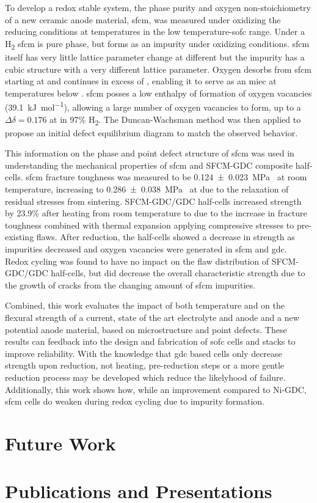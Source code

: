 To develop a redox stable system, the phase purity and oxygen non-stoichiometry of a new ceramic anode material, \gls{sfcm}, was measured under oxidizing the reducing conditions at temperatures in the low temperature-\gls{sofc} range.
Under a H\textsubscript{2} \gls{sfcm} is pure phase, but forms  as an impurity under oxidizing conditions.
\Gls{sfcm} itself has very little lattice parameter change at different  but the impurity  has a cubic structure with a very different lattice parameter.
Oxygen desorbs from \Gls{sfcm} starting at  and continues in excess of , enabling it to serve as an \gls{miec} at temperatures below .
\Gls{sfcm} posses a low enthalpy of formation of oxygen vacancies (\SI{39.1}{\kilo\joule\per\mol}), allowing a large number of oxygen vacancies to form, up to a $\Delta\delta = 0.176$ at  in 97\% H\textsubscript{2}.
The Duncan-Wachsman method was then applied to propose an initial defect equilibrium diagram to match the observed behavior.

This information on the phase and point defect structure of \gls{sfcm} was used in understanding the mechanical properties of \gls{sfcm} and SFCM-GDC composite half-cells.
\Gls{sfcm} fracture toughness was measured to be \SI[separate-uncertainty = true]{0.124 +- 0.023}{\mega\pascal{}} at room temperature, increasing to \SI[separate-uncertainty = true]{0.286 +- 0.038}{\mega\pascal{}} at  due to the relaxation of residual stresses from sintering.
SFCM-GDC/GDC half-cells increased strength by 23.9\% after heating from room temperature to  due to the increase in fracture toughness combined with thermal expansion applying compressive stresses to pre-existing flaws.
After reduction, the half-cells showed a decrease in strength as impurities decreased and oxygen vacancies were generated in \gls{sfcm} and \gls{gdc}.
Redox cycling was found to have no impact on the flaw distribution of SFCM-GDC/GDC half-cells, but did decrease the overall characteristic strength due to the growth of cracks from the changing amount of \gls{sfcm} impurities.

Combined, this work evaluates the impact of both temperature and  on the flexural strength of a current, state of the art electrolyte and anode and a new potential anode material, based on microstructure and point defects.
These results can feedback into the design and fabrication of \gls{sofc} cells and stacks to improve reliability.
With the knowledge that \gls{gdc} based cells only decrease strength upon reduction, not heating, pre-reduction steps or a more gentle reduction process may be developed which reduce the likelyhood of failure.
Additionally, this work shows how, while an improvement compared to Ni-GDC, \gls{sfcm} cells do weaken during redox cycling due to impurity formation.

\section{Future Work}

\section{Publications and Presentations}
